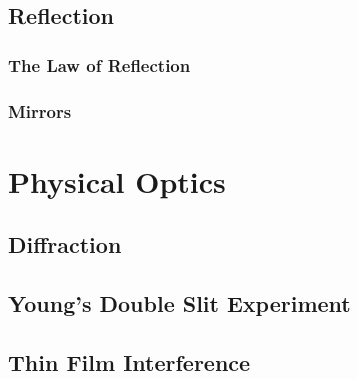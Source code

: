 	\subsection{Reflection}
		\subsubsection{The Law of Reflection}
		\subsubsection{Mirrors}
		
	\section{Physical Optics}
		\subsection{Diffraction}
		\subsection{Young's Double Slit Experiment}
		\subsection{Thin Film Interference}
		
		
		
	

	


